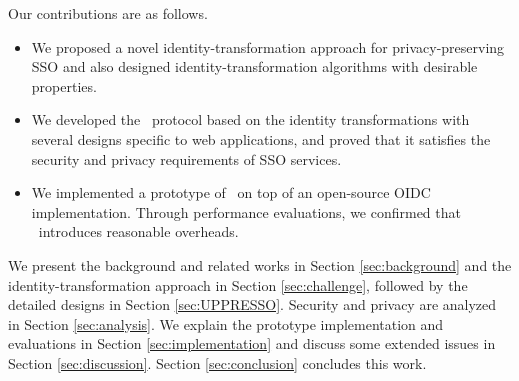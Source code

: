 Our contributions are as follows.
\vspace{-\topsep}
\begin{itemize}
\setlength{\topsep}{0pt}
\setlength{\partopsep}{0pt}
\setlength{\itemsep}{0pt}
\setlength{\parsep}{0pt}
\setlength{\parskip}{0pt}
\item We proposed a novel identity-transformation approach for privacy-preserving SSO and also designed identity-transformation algorithms with desirable properties.
\item We developed the \usso\ protocol based on the identity transformations with several designs specific to web applications, and proved that it satisfies the security and privacy requirements of SSO services.
\item We implemented a prototype of \usso\ on top of an open-source OIDC implementation. Through performance evaluations, we confirmed that \usso\ introduces reasonable overheads.
\end{itemize}


We present the background and related works in Section \ref{sec:background} and the identity-transformation approach in Section \ref{sec:challenge}, followed by the detailed designs in Section \ref{sec:UPPRESSO}.
Security and privacy are analyzed in Section \ref{sec:analysis}.
We explain the prototype implementation and evaluations in Section \ref{sec:implementation} and discuss some extended issues in Section \ref{sec:discussion}. Section \ref{sec:conclusion} concludes this work.
